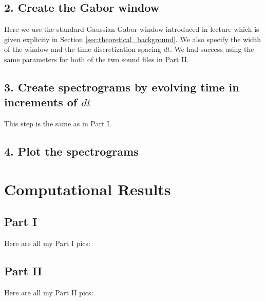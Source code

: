 \documentclass[fleqn,10pt]{../SelfArx} %
\begin{document}
\subsection*{2. Create the Gabor window}
Here we use the standard Gaussian Gabor window introduced in lecture which is given explicity in Section \ref{sec:theoretical_background}. We also specify the width of the window and the time discretization spacing $dt$. We had success using the same parameters for both of the two sound files in Part II.

\subsection*{3. Create spectrograms by evolving time in increments of $dt$}
This step is the same as in Part I.

\subsection*{4. Plot the spectrograms}


\section{Computational Results} %
\label{sec:computational_results}

\subsection{Part I}
Here are all my Part I pics:

\subsection{Part II}

Here are all my Part II pics:

\end{document}
